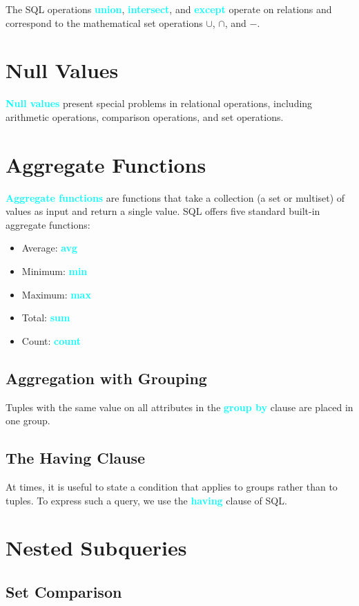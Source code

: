 \documentclass{Beautybook-EN}
\newcommand{\textcy}[1]{\textbf{\textcolor{cyan}{#1}}}
\begin{document}
The SQL operations \textcy{union}, \textcy{intersect}, and \textcy{except} operate on relations and correspond to the mathematical set operations $\cup$, $\cap$, and $-$.

\section{Null Values}

\textcy{Null values} present special problems in relational operations, including arithmetic operations, comparison operations, and set operations.

\section{Aggregate Functions}

\textcy{Aggregate functions} are functions that take a collection (a set or multiset) of values as input and return a single value. SQL offers five standard built-in aggregate functions:
\begin{itemize}
    \item Average: \textcy{avg}
    \item Minimum: \textcy{min}
    \item Maximum: \textcy{max}
    \item Total: \textcy{sum}
    \item Count: \textcy{count}
\end{itemize}

\subsection{Aggregation with Grouping}

Tuples with the same value on all attributes in the \textcy{group by} clause are placed in one group.

\subsection{The Having Clause}

At times, it is useful to state a condition that applies to groups rather than to tuples. To express such a query, we use the \textcy{having} clause of SQL.

\section{Nested Subqueries}
\subsection{Set Comparison}
\end{document}
